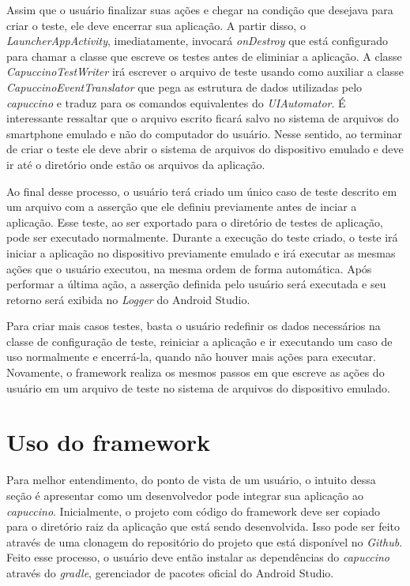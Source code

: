 \documentclass[
    12pt,       %
    openright,      %
    twoside,      %
    a4paper,      %
    english,      %
    french,       %
    spanish,      %
    brazil,       %
    ]{abntex2}
\begin{document}
          Assim que o usuário finalizar suas ações e chegar na condição que desejava para criar o teste, ele
          deve encerrar sua aplicação. A partir disso, o \textit{LauncherAppActivity}, imediatamente, invocará
          \textit{onDestroy} que está configurado para chamar a classe que escreve os testes antes de eliminiar
          a aplicação. A classe \textit{CapuccinoTestWriter} irá escrever o arquivo de teste usando como auxiliar
          a classe \textit{CapuccinoEventTranslator} que pega as estrutura de dados utilizadas pelo
          \textit{capuccino} e traduz para os comandos equivalentes do \textit{UIAutomator}. É interessante
          ressaltar que o arquivo escrito ficará salvo no sistema de arquivos do smartphone emulado e não
          do computador do usuário. Nesse sentido, ao terminar de criar o teste ele deve abrir o sistema
          de arquivos do dispositivo emulado e deve ir até o diretório onde estão os arquivos da aplicação.

          Ao final desse processo, o usuário terá criado um único caso de teste descrito em um arquivo com a
          asserção que ele definiu previamente antes de inciar a aplicação. Esse teste, ao ser exportado
          para o diretório de testes de aplicação, pode ser executado normalmente. Durante a execução do
          teste criado, o teste irá iniciar a aplicação no dispositivo previamente emulado e irá executar
          as mesmas ações que o usuário executou, na mesma ordem de forma automática. Após performar a última
          ação, a asserção definida pelo usuário será executada e seu retorno será exibida no \textit{Logger}
          do Android Studio.

          Para criar mais casos testes, basta o usuário redefinir os dados necessários na classe de configuração
          de teste, reiniciar a aplicação e ir executando um caso de uso normalmente e encerrá-la, quando não
          houver mais ações para executar. Novamente, o framework realiza os mesmos passos em que escreve as
          ações do usuário em um arquivo de teste no sistema de arquivos do dispositivo emulado.

      \section{Uso do framework}
        Para melhor entendimento, do ponto de vista de um usuário, o intuito dessa seção é apresentar como um
        desenvolvedor pode integrar sua aplicação ao \textit{capuccino}. Inicialmente, o projeto com código
        do framework deve ser copiado para o diretório raiz da aplicação que está sendo desenvolvida. Isso pode
        ser feito através de uma clonagem do repositório do projeto que está disponível no \textit{Github}.
        Feito esse processo, o usuário deve então instalar as dependências do \textit{capuccino} através do
        \textit{gradle}, gerenciador de pacotes oficial do Android Studio.
\end{document}
